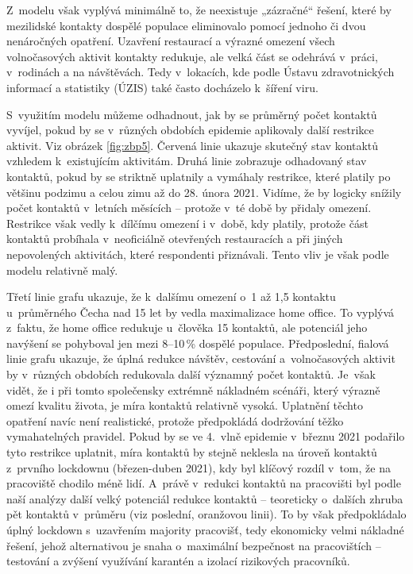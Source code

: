 Z modelu však vyplývá minimálně to, že neexistuje „zázračné“ řešení, které by mezilidské kontakty dospělé populace eliminovalo pomocí jednoho či dvou ne\-ná\-roč\-ných opatření. Uzavření restaurací a výrazné omezení všech volnočasových aktivit kontakty redukuje, ale velká část se odehrává v práci, v rodinách a na návštěvách. Tedy v lokacích, kde podle Ústavu zdravotnických informací a statistiky (ÚZIS) také často docházelo k šíření viru.

S využitím modelu můžeme odhadnout, jak by se průměrný počet kontaktů vyvíjel, pokud by se v různých obdobích epidemie aplikovaly další restrikce aktivit. Viz obrázek \ref{fig:zbp5}. Červená linie ukazuje skutečný stav kontaktů vzhledem k existujícím aktivitám. Druhá linie zobrazuje odhadovaný stav kontaktů, pokud by se striktně uplatnily a vymáhaly restrikce, které platily po většinu podzimu a celou zimu až do 28. února 2021. Vidíme, že by logicky snížily počet kontaktů v letních měsících – protože v té době by přidaly omezení. Restrikce však vedly k dílčímu omezení i v době, kdy platily, protože část kontaktů probíhala v neoficiálně otevřených restauracích a při jiných nepovolených aktivitách, které respondenti přiznávali. Tento vliv je však podle modelu relativně malý. 

Třetí linie grafu ukazuje, že k dalšímu omezení o~1 až 1,5 kontaktu u~průměrného Čecha nad 15 let by vedla maximalizace home office. To vyplývá z faktu, že home office redukuje u člověka 15 kontaktů, ale potenciál jeho navýšení se pohyboval jen mezi 8--10\,\% dospělé populace. Předposlední, fialová linie grafu ukazuje, že úplná redukce návštěv, cestování a volnočasových aktivit by v různých obdobích redukovala další významný počet kontaktů. Je však vidět, že i při tomto společensky extrémně nákladném scénáři, který výrazně omezí kvalitu života, je míra kontaktů relativně vysoká. Uplatnění těchto opatření navíc není realistické, protože předpokládá dodržování těžko vymahatelných pravidel. Pokud by se ve 4. vlně epidemie v březnu 2021 podařilo tyto restrikce uplatnit, míra kontaktů by stejně neklesla na úroveň kontaktů z prvního lockdownu (březen-duben 2021), kdy byl klíčový rozdíl v tom, že na pracoviště chodilo méně lidí. A~právě v redukci kontaktů na pracovišti byl podle naší analýzy další velký potenciál redukce kontaktů – teoreticky o~dalších zhruba pět kontaktů v průměru (viz poslední, oranžovou linii). To by však předpokládalo úplný lockdown s uzavřením majority pracovišť, tedy ekonomicky velmi nákladné řešení, jehož alternativou je snaha o maximální bezpečnost na pracovištích – testování a zvýšení využívání karantén a izolací rizikových pracovníků.

